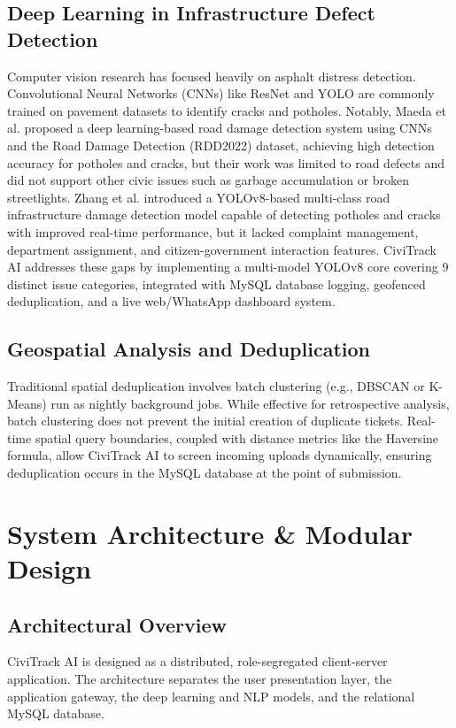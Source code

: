 \documentclass[journal]{IEEEtran}
\begin{document}
\subsection{Deep Learning in Infrastructure Defect Detection}
Computer vision research has focused heavily on asphalt distress detection. Convolutional Neural Networks (CNNs) like ResNet and YOLO are commonly trained on pavement datasets to identify cracks and potholes. Notably, Maeda et al. \cite{b16} proposed a deep learning-based road damage detection system using CNNs and the Road Damage Detection (RDD2022) dataset, achieving high detection accuracy for potholes and cracks, but their work was limited to road defects and did not support other civic issues such as garbage accumulation or broken streetlights. Zhang et al. \cite{b2} introduced a YOLOv8-based multi-class road infrastructure damage detection model capable of detecting potholes and cracks with improved real-time performance, but it lacked complaint management, department assignment, and citizen-government interaction features. CiviTrack AI addresses these gaps by implementing a multi-model YOLOv8 core covering 9 distinct issue categories, integrated with MySQL database logging, geofenced deduplication, and a live web/WhatsApp dashboard system.

\subsection{Geospatial Analysis and Deduplication}
Traditional spatial deduplication involves batch clustering (e.g., DBSCAN or K-Means) run as nightly background jobs. While effective for retrospective analysis, batch clustering does not prevent the initial creation of duplicate tickets. Real-time spatial query boundaries, coupled with distance metrics like the Haversine formula, allow CiviTrack AI to screen incoming uploads dynamically, ensuring deduplication occurs in the MySQL database at the point of submission.

\section{System Architecture \& Modular Design}

\subsection{Architectural Overview}
CiviTrack AI is designed as a distributed, role-segregated client-server application. The architecture separates the user presentation layer, the application gateway, the deep learning and NLP models, and the relational MySQL database.
\end{document}
